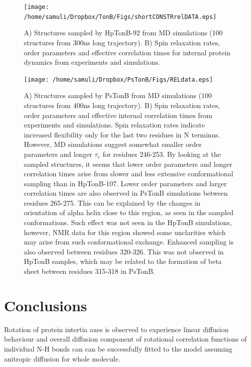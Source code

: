 \documentclass[pre,aps,floatfix,authordate1-4,twocolumn]{revtex4-1}
\begin{document}
\begin{figure}[!p]
  \texttt{[image: /home/samuli/Dropbox/TonB/Figs/shortCONSTRrelDATA.eps]}%
  \caption{A) Structures sampled by HpTonB-92 from MD simulations
    (100 structures from 300ns long trajectory).
    B) Spin relaxation rates, order parameters and effective correlation times for
    internal protein dynamics from experiments and simulations. 
    \label{HpTonB92}}%
\end{figure}

\begin{figure}[!p]
  \texttt{[image: /home/samuli/Dropbox/PsTonB/Figs/RELdata.eps]}%
  \caption{A) Structures sampled by PsTonB from MD simulations
    (100 structures from 400ns long trajectory).
    B) Spin relaxation rates, order parameters and effective internal correlation
    times from experiments and simulations. Spin relaxation rates indicate increased flexibility
    only for the last two residues in N terminus. However,
    MD simulations suggest somewhat smaller order parameters and longer $\tau_e$
    for residues 246-253. By looking at the sampled structures, it seems that lower
    order parameters and longer correlation times arise from slower and less extensive
    conformational sampling than in HpTonB-107. Lower order parameters and larger
    correlation times are also observed in PsTonB simulations between residues 265-275.
    This can be explained by the changes in orientation of alpha helix close to this
    region, as seen in the sampled conformations. Such effect was not seen in the HpTonB
    simulations, however, NMR data for this region showed some unclarities which may arise
    from such conformational exchange. Enhanced sampling is also observed between
    residues 320-326. This was not observed in HpTonB samples, which may be related to the
    formation of beta sheet between residues 315-318 in PsTonB.
    \label{HpTonB92}}%
\end{figure}


\section{Conclusions}

Rotation of protein intertia axes is observed to experience linear
diffusion behaviour and overall diffusion component of rotational 
correlation functions of individual N-H bonds can can be successfully 
fitted to the model assuming anitropic diffusion for whole molecule.
\end{document}
